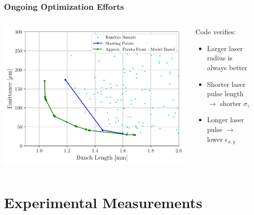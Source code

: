 \documentclass[professionalfonts,t]{beamer}
\begin{document}
\begin{frame}
	\frametitle{Ongoing Optimization Efforts}
\begin{columns}[T] %
	\begin{column}{.56\textwidth}
		\vspace{1em}
		\includegraphics[width=1.0\linewidth, right]{../images/pareto_emittance_vs_zrms}
	\end{column}%
	\hfill%
	\begin{column}{.44\textwidth}
		\vspace{1em}
		Code verifies:
		\begin{itemize}
		\item Larger laser radius is always better
		\item Shorter laser pulse length $\rightarrow$ shorter $\sigma_z$
		\item Longer laser pulse $\rightarrow$ lower $\epsilon_{x,y}$
	    \end{itemize}	
	\end{column}%
\end{columns}
\end{frame}
\section{Experimental Measurements}
\end{document}
